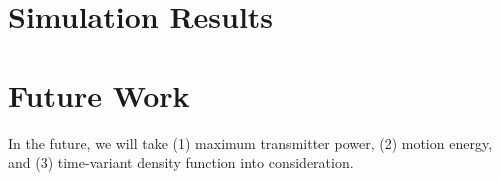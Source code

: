 %
\section{Simulation Results}
 
\section{Future Work}
%
In the future, we will take (1) maximum transmitter power, (2) motion energy, and (3) time-variant density function
into consideration.

